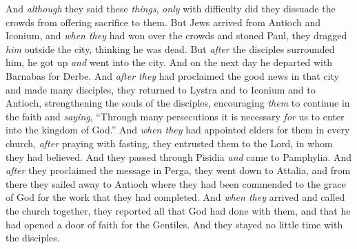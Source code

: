 \begin{biblechapter}
\verse And \textit{although} they said these \textit{things}, \textit{only} with difficulty did they dissuade the crowds from offering sacrifice to them.
\verse But Jews arrived from Antioch and Iconium, and \textit{when they} had won over the crowds and stoned Paul, they dragged \textit{him} outside the city, thinking he was dead.
\verse But \textit{after} the disciples surrounded him, he got up \textit{and} went into the city. And on the next day he departed with Barnabas for Derbe.
 And \textit{after they} had proclaimed the good news in that city and made many disciples, they returned to Lystra and to Iconium and to Antioch,
\verse strengthening the souls of the disciples, encouraging \textit{them} to continue in the faith and \textit{saying}, “Through many persecutions it is necessary \textit{for} us to enter into the kingdom of God.”
\verse And \textit{when they} had appointed elders for them in every church, \textit{after} praying with fasting, they entrusted them to the Lord, in whom they had believed.
\verse And they passed through Pisidia \textit{and} came to Pamphylia.
\verse And \textit{after} they proclaimed the message in Perga, they went down to Attalia,
\verse and from there they sailed away to Antioch where they had been commended to the grace of God for the work that they had completed.
\verse And \textit{when they} arrived and called the church together, they reported all that God had done with them, and that he had opened a door of faith for the Gentiles.
\verse And they stayed no little time with the disciples.
\end{biblechapter}

